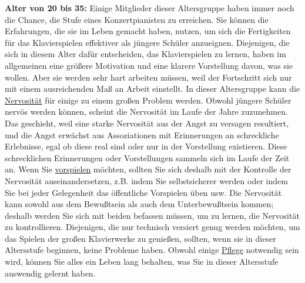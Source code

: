 \textbf{Alter von 20 bis 35:}
Einige Mitglieder dieser Altersgruppe haben immer noch die Chance, die Stufe eines Konzertpianisten zu erreichen.
Sie können die Erfahrungen, die sie im Leben gemacht haben, nutzen, um sich die Fertigkeiten für das Klavierspielen effektiver als jüngere Schüler anzueignen.
Diejenigen, die sich in diesem Alter dafür entscheiden, das Klavierspielen zu lernen, haben im allgemeinen eine größere Motivation und eine klarere Vorstellung davon, was sie wollen.
Aber sie werden sehr hart arbeiten müssen, weil der Fortschritt sich nur mit einem ausreichenden Maß an Arbeit einstellt.
In dieser Altersgruppe kann die \hyperlink{c1iii15}{Nervosität} für einige zu einem großen Problem werden.
Obwohl jüngere Schüler nervös werden können, scheint die Nervosität im Laufe der Jahre zuzunehmen.
Das geschieht, weil eine starke Nervosität aus der Angst zu versagen resultiert, und die Angst erwächst aus Assoziationen mit Erinnerungen an schreckliche Erlebnisse, egal ob diese real sind oder nur in der Vorstellung existieren.
Diese schrecklichen Erinnerungen oder Vorstellungen sammeln sich im Laufe der Zeit an.
Wenn Sie \hyperlink{c1iii14}{vorspielen} möchten, sollten Sie sich deshalb mit der Kontrolle der Nervosität auseinandersetzen, z.B. indem Sie selbstsicherer werden oder indem Sie bei jeder Gelegenheit das öffentliche Vorspielen üben usw.
Die Nervosität kann sowohl aus dem Bewußtsein als auch dem Unterbewußtsein kommen; deshalb werden Sie sich mit beiden befassen müssen, um zu lernen, die Nervosität zu kontrollieren.
Diejenigen, die nur technisch versiert genug werden möchten, um das Spielen der großen Klavierwerke zu genießen, sollten, wenn sie in dieser Altersstufe beginnen, keine Probleme haben.
Obwohl einige \hyperlink{c1iii6c}{Pflege} notwendig sein wird, können Sie alles ein Leben lang behalten, was Sie in dieser Altersstufe auswendig gelernt haben.


\hypertarget{c1iii18c35}{}

